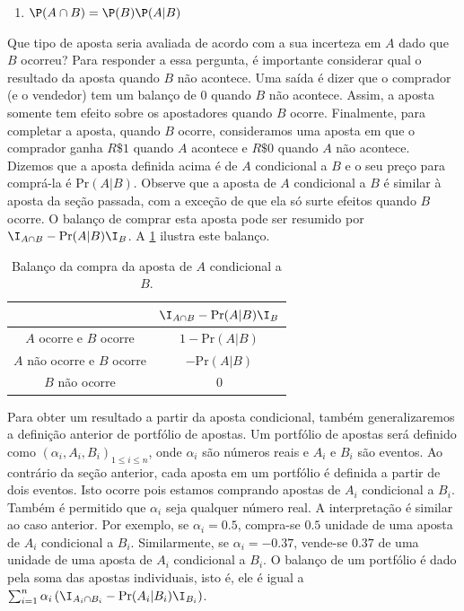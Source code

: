 \begin{enumerate}
 \item $\P(A \cap B) = \P(B)\P(A|B)$
\end{enumerate}

Que tipo de aposta seria avaliada de acordo
com a sua incerteza em $A$ dado que $B$ ocorreu?
Para responder a essa pergunta,
é importante considerar qual o resultado da aposta
quando $B$ não acontece.
Uma saída é dizer que o comprador (e o vendedor)
tem um balanço de $0$ quando $B$ não acontece.
Assim, a aposta somente tem 
efeito sobre os apostadores quando $B$ ocorre.
Finalmente, para completar a aposta, quando $B$ ocorre,
consideramos uma aposta em que o comprador ganha 
$R\$1$ quando $A$ acontece e 
$R\$0$ quando $A$ não acontece.
Dizemos que a aposta definida acima é de 
$A$ condicional a $B$
e o seu preço para comprá-la é $\text{Pr}(A|B)$.
Observe que a aposta de $A$ condicional a $B$ é similar
à aposta da seção passada,
com a exceção de que ela só surte efeitos quando 
$B$ ocorre.
O balanço de comprar esta aposta pode ser resumido por $\I_{A \cap B} - \text{Pr}(A|B)\I_{B}$.
A \cref{table:aposta_a|b} ilustra este balanço.

\begin{table}
 \centering
 \begin{tabular}{|c|c|}
  \hline
  & $\I_{A \cap B} - \text{Pr}(A|B)\I_{B}$ \\
  \hline
  $A$ ocorre e $B$ ocorre
  & $1-\text{Pr}(A|B)$ \\
  $A$ não ocorre e $B$ ocorre
  & $-\text{Pr}(A|B)$ \\
  $B$ não ocorre
  & $0$ \\
  \hline
 \end{tabular}
 \caption{Balanço da compra da aposta de 
 $A$ condicional a $B$.} 
 \label{table:aposta_a|b}
\end{table}

Para obter um resultado a partir da aposta condicional,
também generalizaremos a definição anterior de 
portfólio de apostas.
Um portfólio de apostas será definido
como $(\alpha_{i},A_{i},B_{i})_{1 \leq i \leq n}$, 
onde $\alpha_{i}$ são números reais e
$A_{i}$ e $B_{i}$ são eventos.
Ao contrário da seção anterior, 
cada aposta em um portfólio é definida a partir 
de dois eventos.
Isto ocorre pois estamos comprando apostas de 
$A_{i}$ condicional a $B_{i}$.
Também é permitido que $\alpha_{i}$ seja 
qualquer número real.
A interpretação é similar ao caso anterior.
Por exemplo, se $\alpha_{i}=0.5$, compra-se 
$0.5$ unidade de uma aposta de
$A_{i}$ condicional a $B_{i}$.
Similarmente, se $\alpha_{i}=-0.37$, vende-se 
$0.37$ de uma unidade de uma aposta de 
$A_{i}$ condicional a $B_{i}$.
O balanço de um portfólio é dado pela
soma das apostas individuais,
isto é, ele é igual a $\sum_{i=1}^{n}{\alpha_{i}\left(\I_{A_i \cap B_i}-\text{Pr}(A_{i}|B_{i})\I_{B_i}\right)}$.

